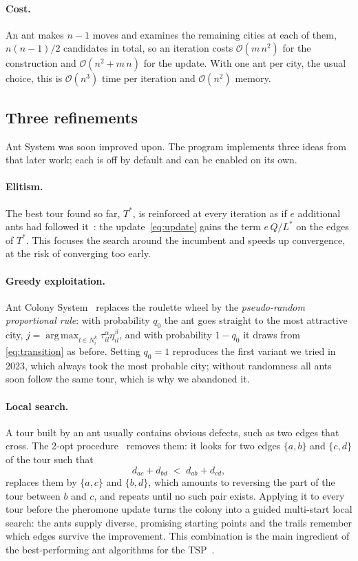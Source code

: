 \documentclass[11pt,a4paper]{article}
\newcommand{\bigO}{\mathcal{O}}
\DeclareMathOperator*{\argmax}{arg\,max}
\begin{document}
\paragraph{Cost.}
An ant makes $n-1$ moves and examines the remaining cities at each of them, $n(n-1)/2$
candidates in total, so an iteration costs $\bigO(m\,n^2)$ for the construction and
$\bigO(n^2+m\,n)$ for the update. With one ant per city, the usual choice, this is
$\bigO(n^3)$ time per iteration and $\bigO(n^2)$ memory.

\subsection{Three refinements}
\label{sec:refinements}

Ant System was soon improved upon. The program implements three ideas from that later work;
each is off by default and can be enabled on its own.

\paragraph{Elitism.}
The best tour found so far, $T^{\ast}$, is reinforced at every iteration as if $e$
additional ants had followed it~\cite{dorigo1996ant}: the update~\eqref{eq:update} gains the
term $e\,Q/L^{\ast}$ on the edges of $T^{\ast}$. This focuses the search around the
incumbent and speeds up convergence, at the risk of converging too early.

\paragraph{Greedy exploitation.}
Ant Colony System~\cite{dorigo1997acs} replaces the roulette wheel by the
\emph{pseudo-random proportional rule}: with probability $q_0$ the ant goes straight to the
most attractive city, $j=\argmax_{l\in N_i^k}\tau_{il}^{\alpha}\eta_{il}^{\beta}$, and with
probability $1-q_0$ it draws from \cref{eq:transition} as before. Setting $q_0=1$
reproduces the first variant we tried in 2023, which always took the most probable city;
without randomness all ants soon follow the same tour, which is why we abandoned it.

\paragraph{Local search.}
\label{sec:local-search}
A tour built by an ant usually contains obvious defects, such as two edges that cross.
The 2-opt procedure~\cite{croes1958method} removes them: it looks for two edges
$\{a,b\}$ and $\{c,d\}$ of the tour such that
\[
    d_{ac}+d_{bd} \;<\; d_{ab}+d_{cd},
\]
replaces them by $\{a,c\}$ and $\{b,d\}$, which amounts to reversing the part of the tour
between $b$ and $c$, and repeats until no such pair exists. Applying it to every tour
before the pheromone update turns the colony into a guided multi-start local search: the
ants supply diverse, promising starting points and the trails remember which edges survive
the improvement. This combination is the main ingredient of the best-performing ant
algorithms for the TSP~\cite{stutzle2000mmas,dorigo2004aco}.
\end{document}
